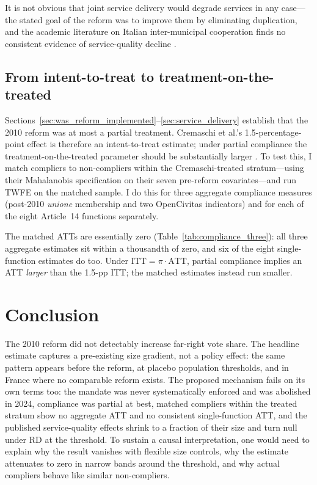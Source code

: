\documentclass[12pt,letterpaper]{article}
\begin{document}
It is not obvious that joint service delivery would degrade services in any case---the stated goal of the reform was to improve them by eliminating duplication, and the academic literature on Italian inter-municipal cooperation finds no consistent evidence of service-quality decline \citep{ferraresi2018, gori2025, luca2021}.

\subsection{From intent-to-treat to treatment-on-the-treated}
\label{sec:compliance_test}

Sections~\ref{sec:was_reform_implemented}--\ref{sec:service_delivery} establish that the 2010 reform was at most a partial treatment. Cremaschi et al.'s 1.5-percentage-point effect is therefore an intent-to-treat estimate; under partial compliance the treatment-on-the-treated parameter should be substantially larger \citep{angrist1996}. To test this, I match compliers to non-compliers within the Cremaschi-treated stratum---using their Mahalanobis specification on their seven pre-reform covariates---and run TWFE on the matched sample. I do this for three aggregate compliance measures (post-2010 \textit{unione} membership and two OpenCivitas indicators) and for each of the eight Article~14 functions separately.



The matched ATTs are essentially zero (Table~\ref{tab:compliance_three}): all three aggregate estimates sit within a thousandth of zero, and six of the eight single-function estimates do too. Under $\text{ITT} = \pi \cdot \text{ATT}$, partial compliance implies an ATT \textit{larger} than the 1.5-pp ITT; the matched estimates instead run smaller.

\FloatBarrier
\section{Conclusion}

The 2010 reform did not detectably increase far-right vote share. The headline estimate captures a pre-existing size gradient, not a policy effect: the same pattern appears before the reform, at placebo population thresholds, and in France where no comparable reform exists. The proposed mechanism fails on its own terms too: the mandate was never systematically enforced and was abolished in 2024, compliance was partial at best, matched compliers within the treated stratum show no aggregate ATT and no consistent single-function ATT, and the published service-quality effects shrink to a fraction of their size and turn null under RD at the threshold. To sustain a causal interpretation, one would need to explain why the result vanishes with flexible size controls, why the estimate attenuates to zero in narrow bands around the threshold, and why actual compliers behave like similar non-compliers.
\end{document}
